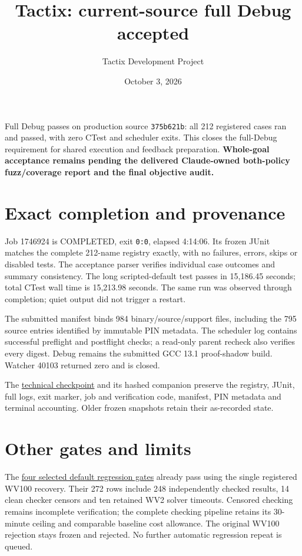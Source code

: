 \documentclass[10pt]{article}
\title{Tactix: current-source full Debug accepted}
\author{Tactix Development Project}
\date{October 3, 2026}
\begin{document}
\maketitle
Full Debug passes on production source \texttt{375b621b}: all 212 registered
cases ran and passed, with zero CTest and scheduler exits. This closes the
full-Debug requirement for shared execution and feedback preparation.
\textbf{Whole-goal acceptance remains pending the delivered Claude-owned
both-policy fuzz/coverage report and the final objective audit.}

\section*{Exact completion and provenance}
Job 1746924 is COMPLETED, exit \texttt{0:0}, elapsed 4:14:06. Its frozen JUnit
matches the complete 212-name registry exactly, with no failures, errors,
skips or disabled tests. The acceptance parser verifies individual case
outcomes and summary consistency. The long scripted-default test passes in
15,186.45 seconds; total CTest wall time is 15,213.98 seconds. The same run
was observed through completion; quiet output did not trigger a restart.

The submitted manifest binds 984 binary/source/support files, including the
795 source entries identified by immutable PIN metadata. The scheduler log
contains successful preflight and postflight checks; a read-only parent
recheck also verifies every digest. Debug remains the submitted GCC 13.1
proof-shadow build. Watcher 40103 returned zero and is closed.

The \href{../../benchmarks/reports/2026-10-03-shared-policy-full-debug-accepted.md}{technical checkpoint}
and its hashed companion preserve the registry, JUnit, full logs, exit marker,
job and verification code, manifest, PIN metadata and terminal accounting.
Older frozen snapshots retain their as-recorded state.

\section*{Other gates and limits}
The \href{../../benchmarks/reports/2026-10-03-shared-policy-regressions-recovered.md}{four selected default regression gates}
already pass using the single registered WV100 recovery. Their 272 rows
include 248 independently checked results, 14 clean checker censors and ten
retained WV2 solver timeouts. Censored checking remains incomplete verification;
the complete checking pipeline retains its 30-minute ceiling and comparable
baseline cost allowance. The original WV100 rejection stays frozen and
rejected. No further automatic regression repeat is queued.
\end{document}
